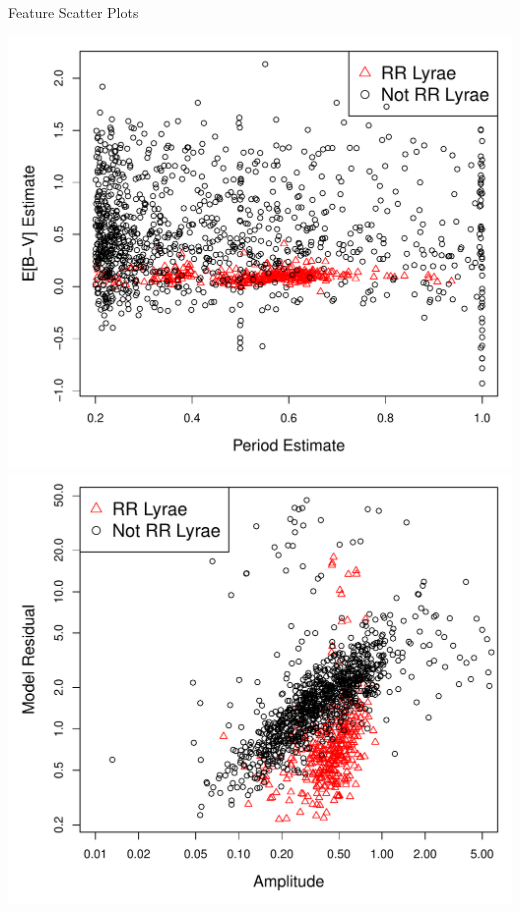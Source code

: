 \documentclass[12pt]{beamer}
\begin{document}
\begin{frame}{Feature Scatter Plots}

\begin{center}
\includegraphics[scale=.33]{figs/period_vs_EBV.pdf}
\includegraphics[scale=.33]{figs/a_vs_dev_log.pdf}
\end{center}

\end{frame}
\end{document}
